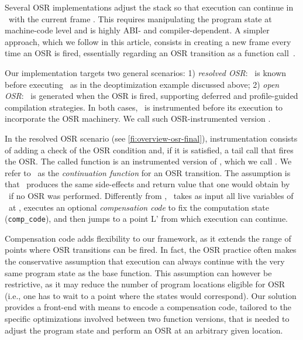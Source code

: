 Several OSR implementations adjust the stack so that execution can continue in \fvariant\ with the current frame \cite{chambers1991self,holzle1992self, suganuma2006region}. This requires manipulating the program state at machine-code level and is highly ABI- and compiler-dependent. A simpler approach, which we follow in this article, consists in creating a new frame every time an OSR is fired, essentially regarding an OSR transition as a function call~\cite{lameed2013modular,webkit14}. 

Our implementation targets two general scenarios: 1) {\em resolved OSR}: \fvariant\ is known before executing \fbase\ as in the deoptimization example discussed above; 2) {\em open OSR}: \fvariant\ is generated when the OSR is fired, supporting deferred and profile-guided compilation strategies. In both cases, \fbase\ is instrumented before its execution to incorporate the OSR machinery. We call such OSR-instrumented version \fosrfrom.

In the resolved OSR scenario (see \myfigure\ref{fi:overview-osr-final}), instrumentation consists of adding a check of the OSR condition and, if it is satisfied, a tail call that fires the OSR. The called function is an instrumented version of \fvariant, which we call \fosrto. We refer to \fosrto\ as the {\em continuation function} for an OSR transition. The assumption is that \fosrto\ produces the same side-effects and return value that one would obtain by \fbase\ if no OSR was performed. Differently from \fvariant, \fosrto\ takes as input all live variables of \fbase\ at \osrpoint, executes an optional {\em compensation code} to fix the computation state ({\tt comp\_code}), and then jumps to a point \textsf{L'} from which execution can continue.

Compensation code adds flexibility to our framework, as it extends the range of points where OSR transitions can be fired. In fact, the OSR practice often makes the conservative assumption that execution can always continue with the very same program state as the base function. %
This assumption can however be restrictive, as it may reduce the number of program locations eligible for OSR (i.e., one has to wait to a point where the states would correspond). Our solution provides a front-end with means to encode a compensation code, tailored to the specific optimizations involved between two function versions, that is needed to adjust the program state and perform an OSR at an arbitrary given location.

